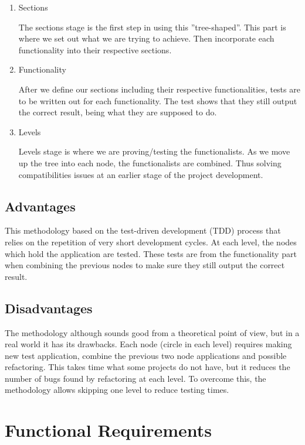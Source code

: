\begin{enumerate}
  \item Sections
  
    The sections stage is the first step in using this ”tree-shaped”. This part is where we set out what we are trying to achieve. Then incorporate each functionality into their respective sections.
    
  \item Functionality   
    
    After we define our sections including their respective functionalities, tests are to be written out for each functionality. The test shows that they still output the correct result, being what they are supposed to do.
    
  \item Levels
  
   Levels stage is where we are proving/testing the functionalists. As we move up the tree into each node, the functionalists are combined. Thus solving compatibilities issues at an earlier stage of the project development.
\end{enumerate}

\subsection{Advantages}

This methodology based on the test-driven development (TDD) process that relies on the repetition of very short development cycles. At each level, the nodes which hold the application are tested. These tests are from the functionality part when combining the previous nodes to make sure they still output the correct result.

\subsection{Disadvantages}

The methodology although sounds good from a theoretical point of view, but in a real world it has its drawbacks. Each node (circle in each level) requires making new test application, combine the previous two node applications and possible refactoring. This takes time what some projects do not have, but it reduces the number of bugs found by refactoring at each level. To overcome this, the methodology allows skipping one level to reduce testing times.

\section{Functional Requirements}

